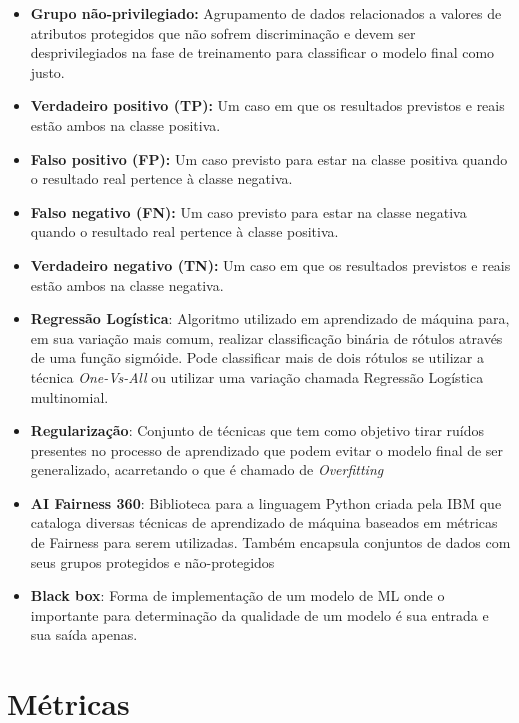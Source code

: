 \documentclass[portugues, 12pt, a4paper]{article}
\begin{document}
\begin{itemize}
\item \textbf{Grupo não-privilegiado:} Agrupamento de dados relacionados a valores de atributos protegidos que não sofrem discriminação e devem ser desprivilegiados na fase de treinamento para classificar o modelo final como justo.

\item \textbf{Verdadeiro positivo (TP):} Um caso em que os resultados previstos e reais estão ambos na classe positiva.

\item \textbf{Falso positivo (FP):} Um caso previsto para estar na classe positiva
quando o resultado real pertence à classe negativa.

\item \textbf{Falso negativo (FN):} Um caso previsto para estar na classe negativa
quando o resultado real pertence à classe positiva.

\item \textbf{Verdadeiro negativo (TN):} Um caso em que os resultados previstos e reais estão ambos na classe negativa.

\item \textbf{Regressão Logística}: Algoritmo utilizado em aprendizado de máquina para, em sua variação mais comum, realizar classificação binária de rótulos através de uma função sigmóide. Pode classificar mais de dois rótulos se utilizar a técnica \textit{One-Vs-All} ou utilizar uma variação chamada Regressão Logística multinomial.

\item \textbf{Regularização}: Conjunto de técnicas que tem como objetivo tirar ruídos presentes no processo de aprendizado que podem evitar o modelo final de ser generalizado, acarretando o que é chamado de \textit{Overfitting}

\item \textbf{AI Fairness 360}: Biblioteca para a linguagem Python criada pela IBM que cataloga diversas técnicas de aprendizado de máquina baseados em métricas de Fairness para serem utilizadas. Também encapsula conjuntos de dados com seus grupos protegidos e não-protegidos

\item \textbf{Black box}: Forma de implementação de um modelo de ML onde o importante para determinação da qualidade de um modelo é sua entrada e sua saída apenas.
\end{itemize}

\section{Métricas}
\end{document}
